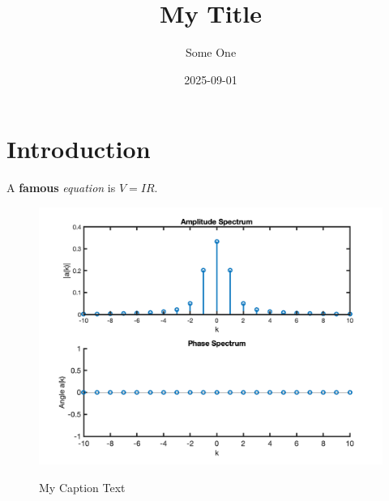 \documentclass{article}
\title{My Title}
\author{Some One}
\date{2025-09-01}
\begin{document}
\maketitle

\section{Introduction}

A \textbf{famous} \textit{equation} is $V = IR$.

\begin{figure}
  \centering
  \includegraphics[alt={As long a description as you like}]{myfig.png}
  \caption{My Caption Text}
\end{figure}
\end{document}
